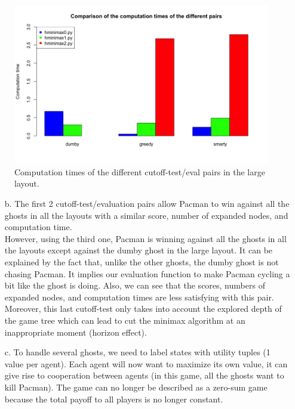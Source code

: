 \documentclass{article}
\begin{document}
		\begin{figure}[H]
			\centering
			\includegraphics[scale=0.45]{plots/3a_times.png} 
			\caption{Computation times of the different cutoff-test/eval pairs in the large layout.}
		\end{figure}
\begin{enumerate}[label=\alph*.,leftmargin=*]	
	\item[b.] The first 2 cutoff-test/evaluation pairs allow Pacman to win against all the ghosts in all the layouts with a similar score, number of expanded nodes, and computation time.\\
	However, using the third one, Pacman is winning against all the ghosts in all the layouts except against the dumby ghost in the large layout. It can be explained by the fact that, unlike the other ghosts, the dumby ghost is not chasing Pacman. It implies our evaluation function to make Pacman cycling a bit like the ghost is doing. Also, we can see that the scores, numbers of expanded nodes, and computation times are less satisfying with this pair.\\
	Moreover, this last cutoff-test only takes into account the explored depth of the game tree which can lead to cut the minimax algorithm at an inappropriate moment (horizon effect).

    \item[c.] To handle several ghosts, we need to label states with utility tuples (1 value per agent). Each agent will now want to maximize its own value, it can give rise to cooperation between agents (in this game, all the ghosts want to kill Pacman). The game can no longer be described as a zero-sum game because the total payoff to all players is no longer constant.

\end{enumerate}

\end{document}
